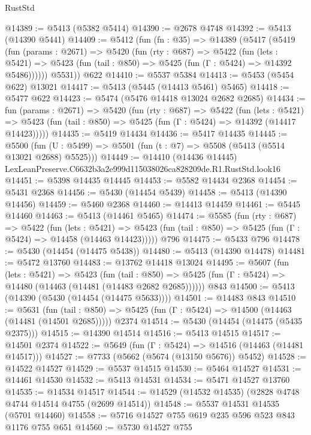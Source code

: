 \begin{lexlean}{RustStd}
\begin{coremodule}
@14389 := @5413 (@5382 @5414)
@14390 := @2678 @4748
@14392 := @5413 (@14390 @5441)
@14409 := @5412
    (fun (fn : @35) =>
    @14389
      (@5417
        (@5419
          (fun (params : @2671) =>
          @5420
            (fun (rty : @687) =>
            @5422
              (fun (lets : @5421) =>
              @5423 (fun (tail : @850) => @5425 (fun (Γ : @5424) => @14392 @5486))))))
        @5531))
    @622
@14410 := @5537 @5384
@14413 := @5453 (@5454 @622) @13021
@14417 := @5413 (@5445 (@14413 @5461) @5465)
@14418 := @5477 @622
@14423 := @5474 (@5476 @14418 @13024 @2682 @2685)
@14434 := fun (params : @2671) =>
  @5420
    (fun (rty : @687) =>
    @5422
      (fun (lets : @5421) =>
      @5423 (fun (tail : @850) => @5425 (fun (Γ : @5424) => @14392 (@14417 @14423)))))
@14435 := @5419 @14434
@14436 := @5417 @14435
@14445 := @5500
    (fun (U : @5499) => @5501 (fun (t : @7) => @5508 (@5413 (@5514 @13021 @2688) @5525)))
@14449 := @14410 (@14436 @14445) LexLeanPreserve.C6632b3a2e999d115038026ca828209de.R1.RustStd.look16
@14451 := @5398 @14435 @14445
@14453 := @5582 @14434 @2368
@14454 := @5431 @2368
@14456 := @5430 (@14454 @5439)
@14458 := @5413 (@14390 @14456)
@14459 := @5460 @2368
@14460 := @14413 @14459
@14461 := @5445 @14460
@14463 := @5413 (@14461 @5465)
@14474 := @5585
    (fun (rty : @687) =>
    @5422
      (fun (lets : @5421) =>
      @5423 (fun (tail : @850) => @5425 (fun (Γ : @5424) => @14458 (@14463 @14423)))))
    @796
@14475 := @5433 @796
@14478 := @5430 (@14454 (@14475 @5438))
@14480 := @5413 (@14390 @14478)
@14481 := @5472 @13760
@14483 := @13762 @14418 @13024
@14495 := @5607
    (fun (lets : @5421) =>
    @5423
      (fun (tail : @850) =>
      @5425 (fun (Γ : @5424) => @14480 (@14463 (@14481 (@14483 @2682 @2685))))))
    @843
@14500 := @5413 (@14390 (@5430 (@14454 (@14475 @5633))))
@14501 := @14483 @843
@14510 := @5631
    (fun (tail : @850) => @5425 (fun (Γ : @5424) => @14500 (@14463 (@14481 (@14501 @2685)))))
    @2374
@14514 := @5430 (@14454 (@14475 (@5435 @2375)))
@14515 := @14390 @14514
@14516 := @5413 @14515
@14517 := @14501 @2374
@14522 := @5649 (fun (Γ : @5424) => @14516 (@14463 (@14481 @14517)))
@14527 := @7733 (@5662 (@5674 (@13150 @5676)) @5452)
@14528 := @14522 @14527
@14529 := @5537 @14515
@14530 := @5464 @14527
@14531 := @14461 @14530
@14532 := @5413 @14531
@14534 := @5471 @14527 @13760
@14535 := @14534 @14517
@14544 := @14529 (@14532 @14535) (@2828 @4748 @4744 @14514 @4755 (@2699 @14514))
@14548 := @5537 @14531 @14535 (@5701 @14460)
@14558 := @5716 @14527 @755 @619 @235 @596 @523 @843 @1176 @755 @651
@14560 := @5730 @14527 @755

\end{coremodule}
\end{lexlean}

